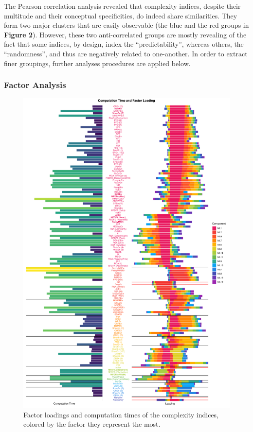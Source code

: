 \documentclass[
  man]{apa6}
\begin{document}
The Pearson correlation analysis revealed that complexity indices, despite their multitude and their conceptual specificities, do indeed share similarities. They form two major clusters that are easily observable (the blue and the red groups in \textbf{Figure 2}). However, these two anti-correlated groups are mostly revealing of the fact that some indices, by design, index the ``predictability'', whereas others, the ``randomness'', and thus are negatively related to one-another. In order to extract finer groupings, further analyses procedures are applied below.

\hypertarget{factor-analysis}{%
\subsubsection{Factor Analysis}\label{factor-analysis}}

\begin{figure}
\centering
\includegraphics{manuscript_files/figure-latex/loadings-1.pdf}
\caption{\label{fig:loadings}Factor loadings and computation times of the complexity indices, colored by the factor they represent the most.}
\end{figure}
\end{document}
